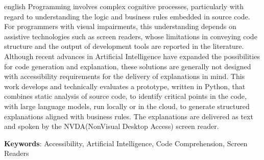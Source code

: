 \documentclass[
    12pt,                   %
    openright,              %
    oneside,                %
    a4paper,                %
    sumario=tradicional,    %
    english,                %
    brazil,                 %
    ]{abntex2}
\begin{document}
\begin{resumo}[Abstract]
\begin{otherlanguage*}{english}
  \noindent
  Programming involves complex cognitive processes, particularly with regard to understanding the logic and business rules embedded in source code. For programmers with visual impairments, this understanding depends on assistive technologies such as screen readers, whose limitations in conveying code structure and the output of development tools are reported in the literature. Although recent advances in Artificial Intelligence have expanded the possibilities for code generation and explanation, these solutions are generally not designed with accessibility requirements for the delivery of explanations in mind. This work develops and technically evaluates a prototype, written in Python, that combines static analysis of source code, to identify critical points in the code, with large language models, run locally or in the cloud, to generate structured explanations aligned with business rules. The explanations are delivered as text and spoken by the NVDA(NonVisual Desktop Access) screen reader.
  \vspace{\onelineskip}

  \noindent
  \textbf{Keywords}: Accessibility, Artificial Intelligence, Code Comprehension, Screen Readers
 \end{otherlanguage*}
\end{resumo}

\listoffigures*
\cleardoublepage

\cleardoublepage




\end{document}
